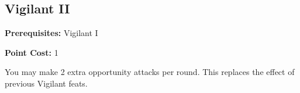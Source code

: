 \subsection{Vigilant II}\label{feat:vigilant2}

\noindent
\textbf{Prerequisites:} Vigilant I

\noindent
\textbf{Point Cost:} 1

You may make 2 extra opportunity attacks per round. This replaces the effect
of previous Vigilant feats.

